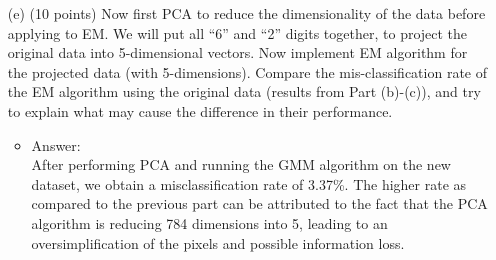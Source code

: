 \documentclass[twoside,10pt]{article}
\begin{document}
\begin{enumerate}
\begin{itemize}
\end{itemize}

\item[(e)] (10 points) Now first PCA to reduce the dimensionality of the data before applying to EM. We will put all ``6'' and ``2'' digits together, to project the original data into 5-dimensional vectors. Now implement EM algorithm for the projected data (with 5-dimensions). Compare the mis-classification rate of the EM algorithm using the original data (results from Part (b)-(c)), and try to explain what may cause the difference in their performance. 

\begin{itemize}
\item Answer:\\
After performing PCA and running the GMM algorithm on the new dataset, we obtain a misclassification rate of 3.37\%. The higher rate as compared to the previous part can be attributed to the fact that the PCA algorithm is reducing 784 dimensions into 5, leading to an oversimplification of the pixels and possible information loss.

\end{itemize}



\end{enumerate}
\end{document}
